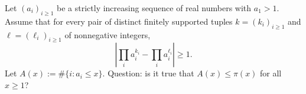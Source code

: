 Let $(a_i)_{i\ge1}$ be a strictly increasing sequence of real numbers with $a_1>1$.
Assume that for every pair of distinct finitely supported tuples $k=(k_i)_{i\ge1}$ and $\ell=(\ell_i)_{i\ge1}$ of nonnegative integers,
\[
\left|\prod_i a_i^{k_i} - \prod_i a_i^{\ell_i}\right|\ge 1.
\]
Let $A(x):=\#\{i: a_i\le x\}$.
Question: is it true that $A(x)\le \pi(x)$ for all $x\ge1$?
